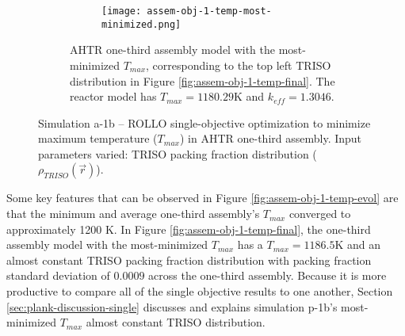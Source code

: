 \begin{figure}[htbp!]
    \ContinuedFloat
    \begin{subfigure}{\textwidth}
        \centering
        \begin{subfigure}{0.7\textwidth}
            \texttt{[image: assem-obj-1-temp-most-minimized.png]}
            \end{subfigure}%
            \begin{subfigure}[t]{.3\textwidth}
            \end{subfigure}
        \caption{\gls{AHTR} one-third assembly model with the most-minimized 
        $T_{max}$, corresponding to the top left TRISO distribution in Figure 
        \ref{fig:assem-obj-1-temp-final}. The reactor model has $T_{max}=1180.29$K
        and $k_{eff}=1.3046$.}
        \label{fig:assem-obj-1-temp-most-minimized} 
    \end{subfigure}
    \caption{Simulation a-1b -- ROLLO single-objective optimization to minimize maximum 
    temperature ($T_{max}$) in \gls{AHTR} one-third assembly. 
    Input parameters varied: \gls{TRISO} packing fraction distribution 
    ($\rho_{TRISO}(\vec{r})$).}
\end{figure}

Some key features that can be observed in Figure \ref{fig:assem-obj-1-temp-evol} are 
that the minimum and average one-third assembly's $T_{max}$ converged to approximately 
1200 K.
In Figure \ref{fig:assem-obj-1-temp-final}, the one-third assembly model with the 
most-minimized $T_{max}$ has a $T_{max}=1186.5$K and an almost constant TRISO packing 
fraction distribution with packing fraction standard deviation of $0.0009$ across the 
one-third assembly. 
Because it is more productive to compare all of the single objective results to one 
another, Section \ref{sec:plank-discussion-single} discusses and explains simulation 
p-1b's most-minimized $T_{max}$ almost constant TRISO distribution. 

